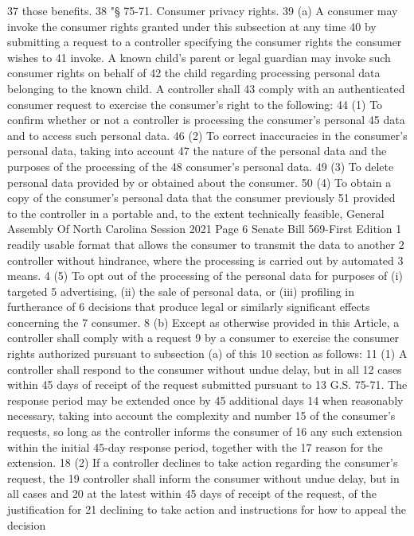 37 those benefits.
38 "§ 75-71. Consumer privacy rights.
39 (a) A consumer may invoke the consumer rights granted under this subsection at any time
40 by submitting a request to a controller specifying the consumer rights the consumer wishes to
41 invoke. A known child's parent or legal guardian may invoke such consumer rights on behalf of
42 the child regarding processing personal data belonging to the known child. A controller shall
43 comply with an authenticated consumer request to exercise the consumer's right to the following:
44 (1) To confirm whether or not a controller is processing the consumer's personal
45 data and to access such personal data.
46 (2) To correct inaccuracies in the consumer's personal data, taking into account
47 the nature of the personal data and the purposes of the processing of the
48 consumer's personal data.
49 (3) To delete personal data provided by or obtained about the consumer.
50 (4) To obtain a copy of the consumer's personal data that the consumer previously
51 provided to the controller in a portable and, to the extent technically feasible, 
General Assembly Of North Carolina Session 2021
Page 6 Senate Bill 569-First Edition
1 readily usable format that allows the consumer to transmit the data to another
2 controller without hindrance, where the processing is carried out by automated
3 means.
4 (5) To opt out of the processing of the personal data for purposes of (i) targeted
5 advertising, (ii) the sale of personal data, or (iii) profiling in furtherance of
6 decisions that produce legal or similarly significant effects concerning the
7 consumer.
8 (b) Except as otherwise provided in this Article, a controller shall comply with a request
9 by a consumer to exercise the consumer rights authorized pursuant to subsection (a) of this
10 section as follows:
11 (1) A controller shall respond to the consumer without undue delay, but in all
12 cases within 45 days of receipt of the request submitted pursuant to
13 G.S. 75-71. The response period may be extended once by 45 additional days
14 when reasonably necessary, taking into account the complexity and number
15 of the consumer's requests, so long as the controller informs the consumer of
16 any such extension within the initial 45-day response period, together with the
17 reason for the extension.
18 (2) If a controller declines to take action regarding the consumer's request, the
19 controller shall inform the consumer without undue delay, but in all cases and
20 at the latest within 45 days of receipt of the request, of the justification for
21 declining to take action and instructions for how to appeal the decision
